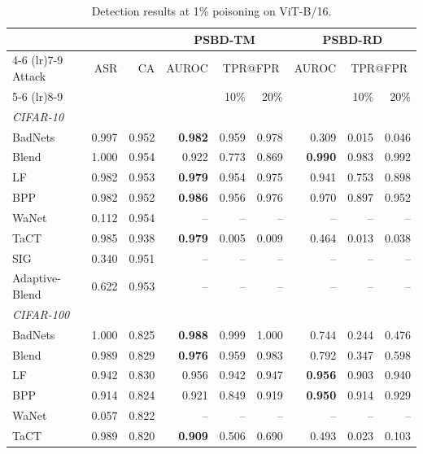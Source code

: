 \begin{table}[htbp]
\centering
\small
\setlength{\tabcolsep}{4pt}
\caption{Detection results at 1\% poisoning on ViT-B/16.}
\label{tab:results-rate-1}
\begin{tabular}{lrrrrrrrr}
\toprule
 & & & \multicolumn{3}{c}{PSBD-TM} & \multicolumn{3}{c}{PSBD-RD} \\
\cmidrule(lr){4-6} \cmidrule(lr){7-9}
Attack & ASR & CA & AUROC & \multicolumn{2}{c}{TPR@FPR} & AUROC & \multicolumn{2}{c}{TPR@FPR} \\
\cmidrule(lr){5-6} \cmidrule(lr){8-9}
 & & & & 10\% & 20\% & & 10\% & 20\% \\
\midrule
\multicolumn{9}{l}{\textit{CIFAR-10}} \\
BadNets & 0.997 & 0.952 & \textbf{0.982} & 0.959 & 0.978 & 0.309 & 0.015 & 0.046 \\
Blend & 1.000 & 0.954 & 0.922 & 0.773 & 0.869 & \textbf{0.990} & 0.983 & 0.992 \\
LF & 0.982 & 0.953 & \textbf{0.979} & 0.954 & 0.975 & 0.941 & 0.753 & 0.898 \\
BPP & 0.982 & 0.952 & \textbf{0.986} & 0.956 & 0.976 & 0.970 & 0.897 & 0.952 \\
WaNet & 0.112 & 0.954 & -- & -- & -- & -- & -- & -- \\
TaCT & 0.985 & 0.938 & \textbf{0.979} & 0.005 & 0.009 & 0.464 & 0.013 & 0.038 \\
SIG & 0.340 & 0.951 & -- & -- & -- & -- & -- & -- \\
Adaptive-Blend & 0.622 & 0.953 & -- & -- & -- & -- & -- & -- \\
\midrule
\multicolumn{9}{l}{\textit{CIFAR-100}} \\
BadNets & 1.000 & 0.825 & \textbf{0.988} & 0.999 & 1.000 & 0.744 & 0.244 & 0.476 \\
Blend & 0.989 & 0.829 & \textbf{0.976} & 0.959 & 0.983 & 0.792 & 0.347 & 0.598 \\
LF & 0.942 & 0.830 & 0.956 & 0.942 & 0.947 & \textbf{0.956} & 0.903 & 0.940 \\
BPP & 0.914 & 0.824 & 0.921 & 0.849 & 0.919 & \textbf{0.950} & 0.914 & 0.929 \\
WaNet & 0.057 & 0.822 & -- & -- & -- & -- & -- & -- \\
TaCT & 0.989 & 0.820 & \textbf{0.909} & 0.506 & 0.690 & 0.493 & 0.023 & 0.103 \\

\end{tabular}
\end{table}
